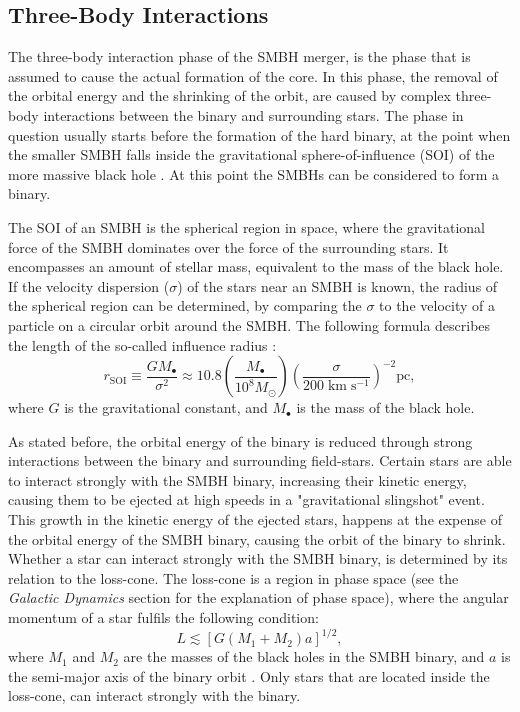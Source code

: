 \documentclass[english, twoside]{HYgradu}
\begin{document}
\subsection{Three-Body Interactions} \label{section:three-body}

The three-body interaction phase of the SMBH merger, is the phase that is assumed to cause the actual formation of the core. In this phase, the removal of the orbital energy and the shrinking of the orbit, are caused by complex three-body interactions between the binary and surrounding stars. The phase in question usually starts before the formation of the hard binary, at the point when the smaller SMBH falls inside the gravitational sphere-of-influence (SOI) of the more massive black hole \citep{MerrittBook}. At this point the SMBHs can be considered to form a binary. 

The SOI of an SMBH is the spherical region in space, where the gravitational force of the SMBH dominates over the force of the surrounding stars. It encompasses an amount of stellar mass, equivalent to the mass of the black hole. If the velocity dispersion ($\sigma$) of the stars near an SMBH is known, the radius of the spherical region can be determined, by comparing the $\sigma$ to the velocity of a particle on a circular orbit around the SMBH. The following formula describes the length of the so-called influence radius \citep{MerrittBook}:
\begin{equation}
r_\mathrm{SOI} \equiv \frac{GM_\bullet}{\sigma^2} \approx 10.8 \left( \frac{M_\bullet}{10^8 M_\odot} \right) \left( \frac{\sigma}{200 \; \mathrm{km \; s^{-1}}} \right)^{-2} \mathrm{pc},
\end{equation}
where $G$ is the gravitational constant, and $M_\bullet$ is the mass of the black hole. 

As stated before, the orbital energy of the binary is reduced through strong interactions between the binary and surrounding field-stars. Certain stars are able to interact strongly with the SMBH binary, increasing their kinetic energy, causing them to be ejected at high speeds in a "gravitational slingshot" event. This growth in the kinetic energy of the ejected stars, happens at the expense of the orbital energy of the SMBH binary, causing the orbit of the binary to shrink. Whether a star can interact strongly with the SMBH binary, is determined by its relation to the loss-cone. The loss-cone is a region in phase space (see the \textit{Galactic Dynamics} section for the explanation of phase space), where the angular momentum of a star fulfils the following condition:
\begin{equation}
L \lesssim \left[ G(M_1 + M_2) a \right]^{1/2}, \label{eq:loss-cone}
\end{equation}
where $M_1$ and $M_2$ are the masses of the black holes in the SMBH binary, and $a$ is the semi-major axis of the binary orbit \citep{BinneyTremaine}. Only stars that are located inside the loss-cone, can interact strongly with the binary.
\end{document}
